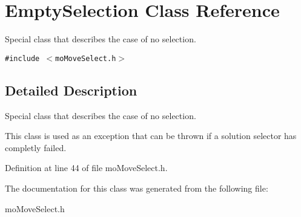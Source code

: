 \section{EmptySelection Class Reference}
\label{class_empty_selection}
Special class that describes the case of no selection.  


{\tt \#include $<$moMoveSelect.h$>$}



\subsection{Detailed Description}
Special class that describes the case of no selection. 

This class is used as an exception that can be thrown if a solution selector has completly failed. 



Definition at line 44 of file moMoveSelect.h.

The documentation for this class was generated from the following file:\begin{CompactItemize}
\item 
moMoveSelect.h\end{CompactItemize}
